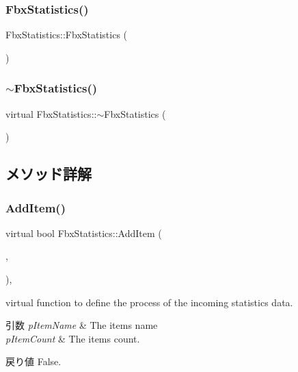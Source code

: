 \subsubsection{\texorpdfstring{Fbx\+Statistics()}{FbxStatistics()}}
{\footnotesize\ttfamily Fbx\+Statistics\+::\+Fbx\+Statistics (\begin{DoxyParamCaption}{ }\end{DoxyParamCaption})}

\mbox{\label{class_fbx_statistics_afabf149366b975f0c5fdc59433c1858e}} 
\subsubsection{\texorpdfstring{$\sim$\+Fbx\+Statistics()}{~FbxStatistics()}}
{\footnotesize\ttfamily virtual Fbx\+Statistics\+::$\sim$\+Fbx\+Statistics (\begin{DoxyParamCaption}{ }\end{DoxyParamCaption})\hspace{0.3cm}{\ttfamily [virtual]}}



\subsection{メソッド詳解}
\mbox{\label{class_fbx_statistics_abd81e5b31d33546ad6ba5fa9af34c792}} 
\subsubsection{\texorpdfstring{Add\+Item()}{AddItem()}}
{\footnotesize\ttfamily virtual bool Fbx\+Statistics\+::\+Add\+Item (\begin{DoxyParamCaption}\item[{\hyperlink{class_fbx_string}{Fbx\+String} \&}]{,  }\item[{int}]{ }\end{DoxyParamCaption})\hspace{0.3cm}{\ttfamily [protected]}, {\ttfamily [virtual]}}

virtual function to define the process of the incoming statistics data. 
\begin{DoxyParams}{引数}
{\em p\+Item\+Name} & The item\textquotesingle{}s name \\
\hline
{\em p\+Item\+Count} & The item\textquotesingle{}s count. \\
\hline
\end{DoxyParams}
\begin{DoxyReturn}{戻り値}
False. 
\end{DoxyReturn}


